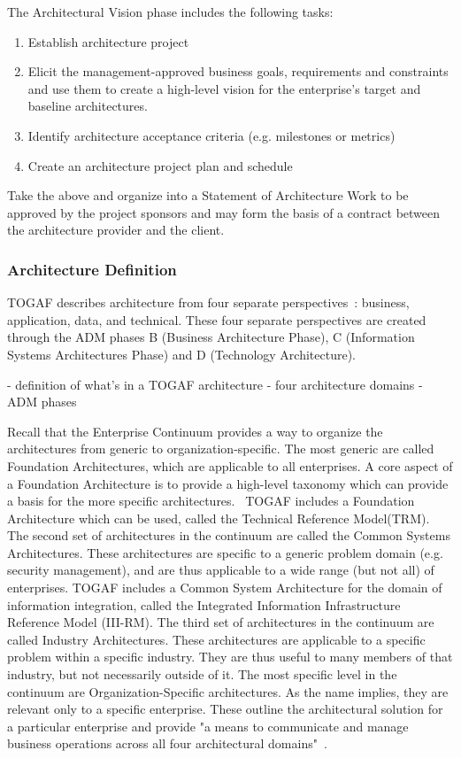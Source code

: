 The Architectural Vision phase includes the following tasks:
\begin{enumerate}
\item Establish architecture project
\item Elicit the management-approved business goals, requirements and constraints and use them to create a high-level vision for the enterprise's target and baseline architectures. 
\item Identify architecture acceptance criteria (e.g. milestones or metrics)
\item Create an architecture project plan and schedule
\end{enumerate}

Take the above and organize into a Statement of Architecture Work to be approved by the project sponsors and may form the basis of a contract between the architecture provider and the client. 


\subsubsection{Architecture Definition}
TOGAF describes architecture from four separate perspectives~\cite{sessions2007}: business, application, data, and technical. These four separate perspectives are created through the ADM phases B (Business Architecture Phase), C (Information Systems Architectures Phase) and D (Technology Architecture).

- definition of what's in a TOGAF architecture
- four architecture domains
- ADM phases

Recall that the Enterprise Continuum provides a way to organize the architectures from generic to organization-specific. The most generic are called Foundation Architectures, which are applicable to all enterprises. A core aspect of a Foundation Architecture is to provide a high-level taxonomy which can provide a basis for the more specific architectures.~\cite{togaf9.1} TOGAF includes a Foundation Architecture which can be used, called the Technical Reference Model(TRM). The second set of architectures in the continuum are called the Common Systems Architectures. These architectures are specific to a generic problem domain (e.g. security management), and are thus applicable to a wide range (but not all) of enterprises. TOGAF includes a Common System Architecture for the domain of information integration, called the Integrated Information Infrastructure Reference Model (III-RM). The third set of architectures in the continuum are called Industry Architectures. These architectures are applicable to a specific problem within a specific industry. They are thus useful to many members of that industry, but not necessarily outside of it. The most specific level in the continuum are Organization-Specific  architectures. As the name implies, they are relevant only to a specific enterprise. These outline the architectural solution for a particular enterprise and provide "a means to communicate and manage business operations across all four architectural domains"~\cite{togaf9.1}.

